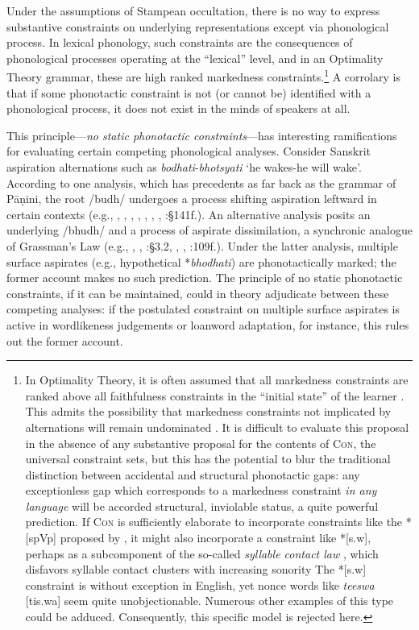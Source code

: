 Under the assumptions of Stampean occultation, there is no way to express substantive constraints on underlying representations except via phonological process.
In lexical phonology, such constraints are the consequences of phonological processes operating at the ``lexical'' level, and in an Optimality Theory grammar, these are high ranked markedness constraints.\footnote{In Optimality Theory, it is often assumed that all markedness constraints are ranked above all faithfulness constraints in the ``initial state'' of the learner \citep[e.g.,][]{Smolensky1996a}.
    This admits the possibility that markedness constraints not implicated by alternations will remain undominated \citep[e.g.,][]{Coetzee2008b}.
    It is difficult to evaluate this proposal in the absence of any substantive proposal for the contents of \textsc{Con}, the universal constraint sets, but this has the potential to blur the traditional distinction between accidental and structural phonotactic gaps: any exceptionless gap which corresponds to a markedness constraint \emph{in any language} will be accorded structural, inviolable status, a quite powerful prediction.
    If \textsc{Con} is sufficiently elaborate to incorporate constraints like the *[spVp] proposed by \citet{Coetzee2008b}, it might also incorporate a constraint like *[s.w], perhaps as a subcomponent of the so-called \emph{syllable contact law} \citep[e.g.,][]{Gouskova2004,Murray1983}, which disfavors syllable contact clusters with increasing sonority 
    The *[s.w] constraint is without exception in English, yet nonce words like \emph{teeswa} [tis.wa] seem quite unobjectionable.
    Numerous other examples of this type could be adduced.
    Consequently, this specific model is rejected here.}
A corrolary is that if some phonotactic constraint is not (or cannot be) identified with a phonological process, it does not exist in the minds of speakers at all.

This principle---\emph{no static phonotactic constraints}---has interesting ramifications for evaluating certain competing phonological analyses.
Consider Sanskrit aspiration alternations such as \emph{bodhati}-\emph{bhotsyati} `he wakes-he will wake'.
According to one analysis, which has precedents as far back as the grammar of Pāṇini, the root /budh/ undergoes a process shifting aspiration leftward in certain contexts (e.g., \citealt{Borowsky1983}, \citealt{Hoenigswald1965}, \citealt{Kaye1985}, \citealt{Sag1974}, \citeyear{Sag1976}, \citealt{Schindler1976}, \citealt{Stemberger1980}, \citealt{Whitney1889}:\S141f.).
An alternative analysis posits an underlying /bhudh/ and a process of aspirate dissimilation, a synchronic analogue of Grassman's Law (e.g., \citealt{Anderson1970}, \citealt{Hoard1975}, \citealt{Kiparsky1965}:\S3.2, \citealt{Phelps1973}, \citealt{Phelps1975b}, \citealt{Zwicky1965}:109f.).
Under the latter analysis, multiple surface aspirates (e.g., hypothetical *\emph{bhodhati}) are phonotactically marked; the former account makes no such prediction.
The principle of no static phonotactic constraints, if it can be maintained, could in theory adjudicate between these competing analyses: if the postulated constraint on multiple surface aspirates is active in wordlikeness judgements or loanword adaptation, for instance, this rules out the former account.

